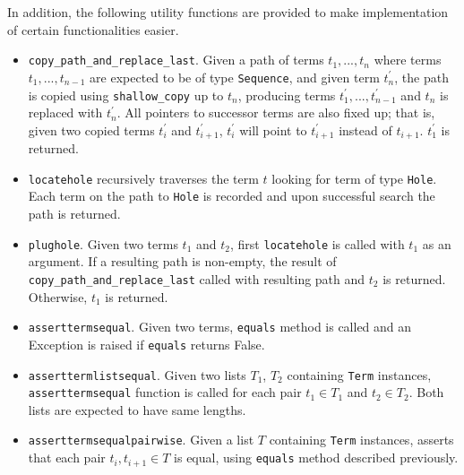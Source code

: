 In addition, the following utility functions are provided to make implementation of certain functionalities easier.

\begin{itemize}
\item
	\texttt{copy\_path\_and\_replace\_last}. Given a path of terms $t_1, ..., t_n$  where terms $t_1, ..., t_{n-1}$ are expected to be of type \texttt{Sequence}, and given term $t_n^{\prime}$, the path is copied using \texttt{shallow\_copy} up to $t_n$, producing terms $t_1^\prime, ..., t_{n-1}^\prime$ and $t_n$ is replaced with $t_n^{\prime}$. All pointers to successor terms are also fixed up; that is, given two copied terms $t_i^{\prime}$ and $t_{i+1}^{\prime}$, $t_i^{\prime}$ will point to $t_{i+1}^{\prime}$ instead of $t_{i+1}$. $t_1^\prime$ is returned.
\item
	\texttt{locatehole} recursively traverses the term $t$ looking for term of type \texttt{Hole}. Each term on the path to \texttt{Hole} is recorded and upon successful search the path is returned.
\item
	\texttt{plughole}. Given two terms $t_1$ and $t_2$, first \texttt{locatehole} is called with $t_1$ as an argument. If a resulting path is non-empty, the result of \texttt{copy\_path\_and\_replace\_last} called with resulting path and $t_2$ is returned. Otherwise, $t_1$ is returned.
\item
	\texttt{asserttermsequal}. Given two terms, \texttt{equals} method is called and an Exception is raised if \texttt{equals} returns False.
\item
	\texttt{asserttermlistsequal}. Given two lists $T_1$, $T_2$ containing \texttt{Term} instances, \\ \texttt{asserttermsequal} function is called for each pair $t_1 \in T_1$ and $t_2 \in T_2$. Both lists are expected to have same lengths.
\item 
	\texttt{asserttermsequalpairwise}. Given a list $T$ containing \texttt{Term} instances, asserts that each pair $t_i, t_{i+1} \in T$ is equal, using \texttt{equals} method described previously.
\end{itemize}
